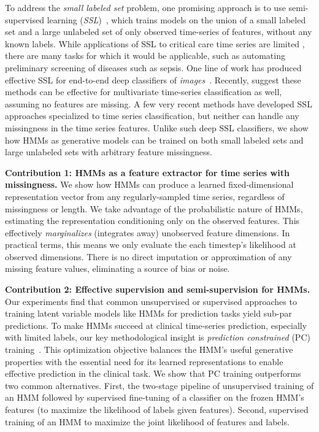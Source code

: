 To address the \emph{small labeled set} problem, one promising approach is to use semi-supervised learning (\emph{SSL})~\citep{vanengelenSurveySemisupervisedLearning2020}, which trains models on the union of a small labeled set and a large unlabeled set of only observed time-series of features, without any known labels.
While applications of SSL to critical care time series are limited \citep{ahuja2022semi, poulain2022few, lam2021semisupervised}, there are many tasks for which it would be applicable, such as automating preliminary screening of diseases such as sepsis. One line of work has produced effective SSL for end-to-end deep classifiers of \emph{images}~\citep{miyato2018virtual,berthelotMixMatchHolisticApproach2019,sohnFixMatchSimplifyingSemisupervised2020}.
Recently, \citet{goschenhofer2021deep} suggest these methods can be effective for multivariate time-series classification as well, assuming no features are missing. 
A few very recent methods \citep{shin2023context,xing2022selfmatch} have developed SSL approaches specialized to time series classification, but neither can handle any missingness in the time series features.
Unlike such deep SSL classifiers, we show how HMMs as generative models can be trained on both small labeled sets and large unlabeled sets with arbitrary feature missingness.

\textbf{Contribution 1: HMMs as a feature extractor for time series with missingness.}
We show how HMMs can produce a learned fixed-dimensional representation vector from any regularly-sampled time series, regardless of missingness or length.
We take advantage of the probabilistic nature of HMMs, estimating the representation conditioning only on the observed features.
This effectively \emph{marginalizes} (integrates away) unobserved feature dimensions.
In practical terms, this means we only evaluate the each timestep's likelihood at observed dimensions.
There is no direct imputation or approximation of any missing feature values, eliminating a source of bias or noise.

\textbf{Contribution 2: Effective supervision and semi-supervision for HMMs.} 
Our experiments find that common unsupervised or supervised approaches to training latent variable models like HMMs for prediction tasks yield sub-par predictions.
To make HMMs succeed at clinical time-series prediction, especially with limited labels, our key methodological insight is \emph{prediction constrained} (PC) training~\citep{hopePredictionConstrainedHiddenMarkov2021,hughes_prediction-constrained_2017}.
This optimization objective balances the HMM's useful generative properties with the essential need for its learned representations to enable effective prediction in the clinical task. 
We show that PC training outperforms two common alternatives. First, the two-stage pipeline of unsupervised training of an HMM followed by supervised fine-tuning of a classifier on the frozen HMM's features (to maximize the likelihood of labels given features).
Second, supervised training of an HMM to maximize the joint likelihood of features and labels.

